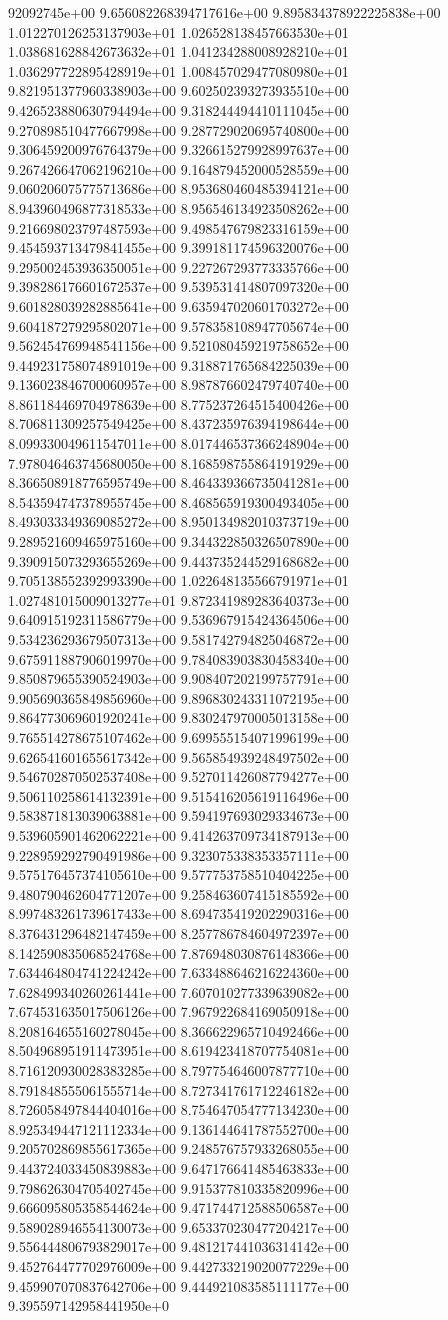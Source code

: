 92092745e+00	9.656082268394717616e+00	9.895834378922225838e+00	1.012270126253137903e+01	1.026528138457663530e+01	1.038681628842673632e+01	1.041234288008928210e+01	1.036297722895428919e+01	1.008457029477080980e+01	9.821951377960338903e+00	9.602502393273935510e+00	9.426523880630794494e+00	9.318244494410111045e+00	9.270898510477667998e+00	9.287729020695740800e+00	9.306459200976764379e+00	9.326615279928997637e+00	9.267426647062196210e+00	9.164879452000528559e+00	9.060206075775713686e+00	8.953680460485394121e+00	8.943960496877318533e+00	8.956546134923508262e+00	9.216698023797487593e+00	9.498547679823316159e+00	9.454593713479841455e+00	9.399181174596320076e+00	9.295002453936350051e+00	9.227267293773335766e+00	9.398286176601672537e+00	9.539531414807097320e+00	9.601828039282885641e+00	9.635947020601703272e+00	9.604187279295802071e+00	9.578358108947705674e+00	9.562454769948541156e+00	9.521080459219758652e+00	9.449231758074891019e+00	9.318871765684225039e+00	9.136023846700060957e+00	8.987876602479740740e+00	8.861184469704978639e+00	8.775237264515400426e+00	8.706811309257549425e+00	8.437235976394198644e+00	8.099330049611547011e+00	8.017446537366248904e+00	7.978046463745680050e+00	8.168598755864191929e+00	8.366508918776595749e+00	8.464339366735041281e+00	8.543594747378955745e+00	8.468565919300493405e+00	8.493033349369085272e+00	8.950134982010373719e+00	9.289521609465975160e+00	9.344322850326507890e+00	9.390915073293655269e+00	9.443735244529168682e+00	9.705138552392993390e+00	1.022648135566791971e+01	1.027481015009013277e+01	9.872341989283640373e+00	9.640915192311586779e+00	9.536967915424364506e+00	9.534236293679507313e+00	9.581742794825046872e+00	9.675911887906019970e+00	9.784083903830458340e+00	9.850879655390524903e+00	9.908407202199757791e+00	9.905690365849856960e+00	9.896830243311072195e+00	9.864773069601920241e+00	9.830247970005013158e+00	9.765514278675107462e+00	9.699555154071996199e+00	9.626541601655617342e+00	9.565854939248497502e+00	9.546702870502537408e+00	9.527011426087794277e+00	9.506110258614132391e+00	9.515416205619116496e+00	9.583871813039063881e+00	9.594197693029334673e+00	9.539605901462062221e+00	9.414263709734187913e+00	9.228959292790491986e+00	9.323075338353357111e+00	9.575176457374105610e+00	9.577753758510404225e+00	9.480790462604771207e+00	9.258463607415185592e+00	8.997483261739617433e+00	8.694735419202290316e+00	8.376431296482147459e+00	8.257786784604972397e+00	8.142590835068524768e+00	7.876948030876148366e+00	7.634464804741224242e+00	7.633488646216224360e+00	7.628499340260261441e+00	7.607010277339639082e+00	7.674531635017506126e+00	7.967922684169050918e+00	8.208164655160278045e+00	8.366622965710492466e+00	8.504968951911473951e+00	8.619423418707754081e+00	8.716120930028383285e+00	8.797754646007877710e+00	8.791848555061555714e+00	8.727341761712246182e+00	8.726058497844404016e+00	8.754647054777134230e+00	8.925349447121112334e+00	9.136144641787552700e+00	9.205702869855617365e+00	9.248576757933268055e+00	9.443724033450839883e+00	9.647176641485463833e+00	9.798626304705402745e+00	9.915377810335820996e+00	9.666095805358544624e+00	9.471744712588506587e+00	9.589028946554130073e+00	9.653370230477204217e+00	9.556444806793829017e+00	9.481217441036314142e+00	9.452764477702976009e+00	9.442733219020077229e+00	9.459907070837642706e+00	9.444921083585111177e+00	9.395597142958441950e+0